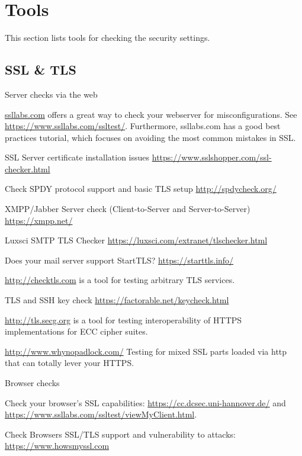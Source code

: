 \chapter{Tools}
\label{cha:tools}
This section lists tools for checking the security settings.

\section{SSL \& TLS}

Server checks via the web
\begin{itemize*}
  \item \href{https://ssllabs.com}{ssllabs.com} offers a great way to check your webserver for misconfigurations. See \url{https://www.ssllabs.com/ssltest/}. Furthermore, ssllabs.com has a good best practices tutorial, which focuses on avoiding the most common mistakes in SSL.
  \item SSL Server certificate installation issues \url{https://www.sslshopper.com/ssl-checker.html}
  \item Check SPDY protocol support and basic TLS setup \url{http://spdycheck.org/}
  \item XMPP/Jabber Server check (Client-to-Server and Server-to-Server) \url{https://xmpp.net/}
  \item Luxsci SMTP TLS Checker \url{https://luxsci.com/extranet/tlschecker.html}
  \item Does your mail server support StartTLS? \url{https://starttls.info/}
  \item \url{http://checktls.com} is a tool for testing arbitrary TLS services.
  \item TLS and SSH key check \url{https://factorable.net/keycheck.html}
  \item \url{http://tls.secg.org} is a tool for testing interoperability of HTTPS implementations for ECC cipher suites.
  \item \url{http://www.whynopadlock.com/} Testing for mixed SSL parts loaded via http that can totally lever your HTTPS.
\end{itemize*}

Browser checks
\begin{itemize*}
  \item Check your browser's SSL capabilities: \url{https://cc.dcsec.uni-hannover.de/} and \url{https://www.ssllabs.com/ssltest/viewMyClient.html}.
  \item Check Browsers SSL/TLS support and vulnerability to attacks: \url{https://www.howsmyssl.com}
\end{itemize*}


